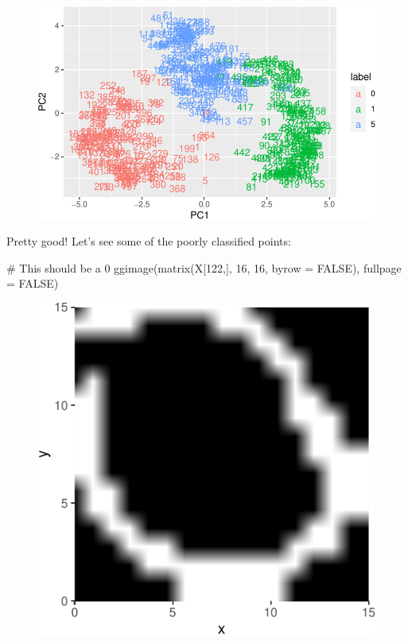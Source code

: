 \documentclass[
  letterpaper,
  DIV=11,
  numbers=noendperiod]{scrreprt}
\newenvironment{Shaded}{\begin{snugshade}}{\end{snugshade}}
\newcommand{\AttributeTok}[1]{\textcolor[rgb]{0.40,0.45,0.13}{#1}}
\newcommand{\CommentTok}[1]{\textcolor[rgb]{0.37,0.37,0.37}{#1}}
\newcommand{\ConstantTok}[1]{\textcolor[rgb]{0.56,0.35,0.01}{#1}}
\newcommand{\DecValTok}[1]{\textcolor[rgb]{0.68,0.00,0.00}{#1}}
\newcommand{\FunctionTok}[1]{\textcolor[rgb]{0.28,0.35,0.67}{#1}}
\newcommand{\NormalTok}[1]{\textcolor[rgb]{0.00,0.23,0.31}{#1}}
\begin{document}
\begin{figure}[H]

{\centering \includegraphics{./11-SVD_PCA_files/figure-pdf/unnamed-chunk-12-1.pdf}

}

\end{figure}

Pretty good! Let's see some of the poorly classified points:

\begin{Shaded}
\begin{Highlighting}[]
\CommentTok{\# This should be a 0}
\FunctionTok{ggimage}\NormalTok{(}\FunctionTok{matrix}\NormalTok{(X[}\DecValTok{122}\NormalTok{,], }\DecValTok{16}\NormalTok{, }\DecValTok{16}\NormalTok{, }\AttributeTok{byrow =} \ConstantTok{FALSE}\NormalTok{), }\AttributeTok{fullpage =} \ConstantTok{FALSE}\NormalTok{)}
\end{Highlighting}
\end{Shaded}

\begin{figure}[H]

{\centering \includegraphics{./11-SVD_PCA_files/figure-pdf/unnamed-chunk-13-1.pdf}

}

\end{figure}
\end{document}
